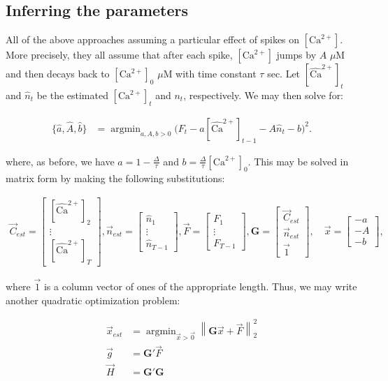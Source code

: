 \documentclass[12pt]{article}
\providecommand{\ve}[1]{\vec{#1}}
\providecommand{\ma}[1]{\boldsymbol{#1}}
\providecommand{\norm}[1]{\left \lVert#1 \right  \rVert}
\providecommand{\ve}[1]{\boldsymbol{#1}}
\DeclareMathOperator*{\argmin}{argmin}
\newcommand{\Ca}{[\text{Ca}^{2+}]}
\newcommand{\Cae}{[\widehat{\text{Ca}}^{2+}]}
\newcommand{\Cav}{\ve{C}}%
\begin{document}
\subsection{Inferring the parameters}

All of the above approaches assuming a particular effect of spikes on $\Ca$.  More precisely, they all assume that after each spike, $\Ca$ jumps by $A$ $\mu$M and then decays back to $\Ca_0$ $\mu$M with time constant $\tau$ sec.  Let $\Cae_t$ and $\widehat{n}_t$ be the estimated $\Ca_t$ and $n_t$, respectively.  We may then solve for:

\begin{align}
\{\widehat{a}, \widehat{A}, \widehat{b}\} &= \argmin_{a,A,b>0} \big(F_t - a \Cae_{t-1} - A \widehat{n}_t - b\big)^2.
\end{align}

\noindent where, as before, we have $a=1-\frac{\Delta}{\tau}$ and $b=\frac{\Delta}{\tau}\Ca_0$. This may be solved in matrix form by making the following substitutions:

\begin{align}
\Cav_{est} =\begin{bmatrix} \Cae_2\\ \vdots \\ \Cae_T \end{bmatrix},
\ve{n}_{est}=\begin{bmatrix} \widehat{n}_1\\ \vdots \\ \widehat{n}_{T-1} \end{bmatrix},
\ve{F}=\begin{bmatrix} F_1\\ \vdots \\ F_{T-1} \end{bmatrix},
\ma{G}=\begin{bmatrix} \Cav_{est}\\ \ve{n}_{est}\\ \ve{1} \end{bmatrix},
\quad \ve{x}=\begin{bmatrix} -a\\ -A\\ -b \end{bmatrix},
\end{align}

\noindent where $\ve{1}$ is a column vector of ones of the appropriate length.  Thus, we may write another quadratic optimization problem:

\begin{align}
\ve{x}_{est}&=\argmin_{\ve{x}>\ve{0}} \norm{\ma{G} \ve{x} + \ve{F}}_2^2\\
\ve{g} &= \ma{G}'\ve{F}\\
\ve{H} &= \ma{G}'\ma{G}
\end{align}
\end{document}
